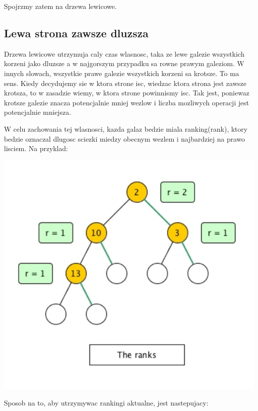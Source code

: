 \documentclass{article}
\begin{document}
Spojrzmy zatem na drzewa lewicowe.

\subsection{Lewa strona zawsze dluzsza}

Drzewa lewicowe utrzymuja caly czas wlasnosc, taka ze lewe galezie wszystkich korzeni jako dluzsze a w najgorszym przypadku sa rowne prawym galeziom. W innych slowach, wszystkie prawe galezie wszystkich korzeni sa krotsze. To ma sens. Kiedy decydujemy sie w ktora strone isc, wiedzac ktora strona jest zawsze krotsza, to w zasadzie wiemy, w ktora strone powinnismy isc. Tak jest, poniewaz krotsze galezie znacza potencjalnie mniej wezlow i liczba mozliwych operacji jest potencjalnie mniejsza.

W celu zachowania tej wlasnosci, kazda galaz bedzie miala ranking(rank), ktory bedzie oznaczal dlugosc sciezki miedzy obecnym wezlem i najbardziej na prawo lisciem. Na przyklad:


\begin{center}
    \begin{minipage}[h]{0.8\textwidth}
        \centering
        \includegraphics[width=1.0\textwidth]{ranks.png}
    \end{minipage}    
\end{center}

Sposob na to, aby utrzymywac rankingi aktualne, jest nastepujacy:
\end{document}
